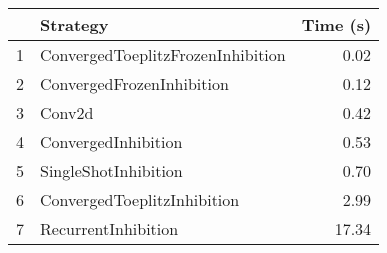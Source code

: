 \begin{tabular}{llr}
\toprule
{} &                           Strategy & Time (s) \\
\midrule
1 &  ConvergedToeplitzFrozenInhibition &     0.02 \\
2 &          ConvergedFrozenInhibition &     0.12 \\
3 &                             Conv2d &     0.42 \\
4 &                ConvergedInhibition &     0.53 \\
5 &               SingleShotInhibition &     0.70 \\
6 &        ConvergedToeplitzInhibition &     2.99 \\
7 &                RecurrentInhibition &    17.34 \\
\bottomrule
\end{tabular}
